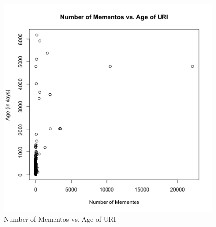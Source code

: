 \documentclass[letterpaper,11pt]{article}
\begin{document}
\begin{figure}
\includegraphics[scale=0.7]{work/q3/q3-scatterplot.png}
\caption{Number of Mementos vs. Age of URI}
\label{fig:q3scatter}
\end{figure}

\newpage


\newpage


\newpage

\end{document}
